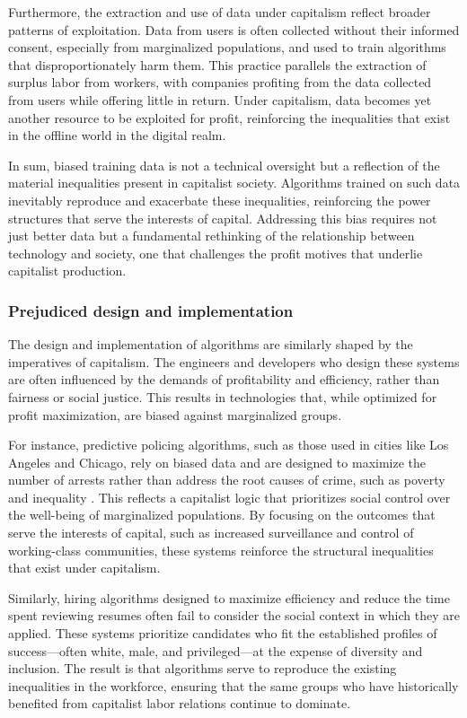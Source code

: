 Furthermore, the extraction and use of data under capitalism reflect broader patterns of exploitation. Data from users is often collected without their informed consent, especially from marginalized populations, and used to train algorithms that disproportionately harm them. This practice parallels the extraction of surplus labor from workers, with companies profiting from the data collected from users while offering little in return. Under capitalism, data becomes yet another resource to be exploited for profit, reinforcing the inequalities that exist in the offline world in the digital realm.

In sum, biased training data is not a technical oversight but a reflection of the material inequalities present in capitalist society. Algorithms trained on such data inevitably reproduce and exacerbate these inequalities, reinforcing the power structures that serve the interests of capital. Addressing this bias requires not just better data but a fundamental rethinking of the relationship between technology and society, one that challenges the profit motives that underlie capitalist production.

\subsubsection{Prejudiced design and implementation}

The design and implementation of algorithms are similarly shaped by the imperatives of capitalism. The engineers and developers who design these systems are often influenced by the demands of profitability and efficiency, rather than fairness or social justice. This results in technologies that, while optimized for profit maximization, are biased against marginalized groups.

For instance, predictive policing algorithms, such as those used in cities like Los Angeles and Chicago, rely on biased data and are designed to maximize the number of arrests rather than address the root causes of crime, such as poverty and inequality \cite[pp.~45-48]{benjamin2019}. This reflects a capitalist logic that prioritizes social control over the well-being of marginalized populations. By focusing on the outcomes that serve the interests of capital, such as increased surveillance and control of working-class communities, these systems reinforce the structural inequalities that exist under capitalism.

Similarly, hiring algorithms designed to maximize efficiency and reduce the time spent reviewing resumes often fail to consider the social context in which they are applied. These systems prioritize candidates who fit the established profiles of success—often white, male, and privileged—at the expense of diversity and inclusion. The result is that algorithms serve to reproduce the existing inequalities in the workforce, ensuring that the same groups who have historically benefited from capitalist labor relations continue to dominate.

